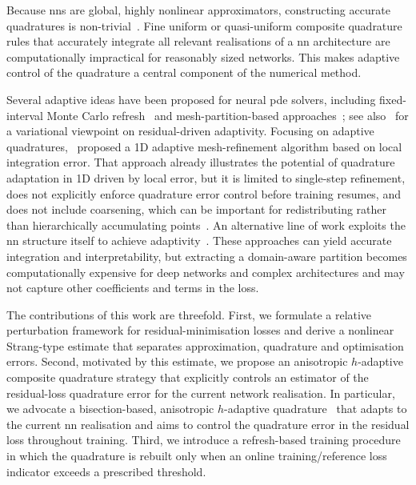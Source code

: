 \documentclass[oneside,reqno,11pt,a4paper]{amsart}
\theoremstyle{definition}
\begin{document}
Because \acp{nn}
are global, highly nonlinear approximators, constructing accurate quadratures
is non-trivial~\cite{Feischl2025nnhard}. Fine uniform or quasi-uniform composite
quadrature rules that accurately integrate all relevant realisations of a
\ac{nn} architecture are computationally impractical for reasonably
sized networks. This makes adaptive control of the quadrature a central component of the numerical method.

Several adaptive ideas have been proposed for neural \ac{pde} solvers,
including fixed-interval Monte Carlo refresh~\cite{Wang2023PINNsGuide} and 
mesh-partition-based approaches~\cite{DLS-Cai-2020, Liu-Cai-Ramani-2023}; see
also~\cite{Toscano2025adaptivity} for a variational viewpoint on
residual-driven adaptivity. Focusing on adaptive quadratures,~\cite{RiveraPINNQuadrature2022} proposed a
1D adaptive mesh-refinement algorithm based on local integration error.
That approach already illustrates the potential of
quadrature adaptation in 1D driven by local error, but it is limited to single-step refinement,
does not explicitly enforce quadrature error control before training resumes,
and does not include coarsening, which can be important for redistributing
rather than hierarchically accumulating points~\cite{AdaptiveFEINNs2024}.
An alternative line of work exploits the \ac{nn} structure itself to
achieve adaptivity~\cite{MagueresseBadiaAdaptive2024, LiuAdaptiveFA2022}. These approaches can yield accurate
integration and interpretability, but extracting a domain-aware partition
becomes computationally expensive for deep networks and complex architectures
\cite{PirateNets2024} and may not capture other coefficients and terms in the
loss.

The contributions of this work are threefold. First, we formulate a relative perturbation framework for residual-minimisation losses and derive a nonlinear Strang-type estimate that separates approximation, quadrature and optimisation errors. Second, motivated by this estimate, we propose an anisotropic $h$-adaptive composite quadrature strategy that explicitly controls an estimator of the residual-loss quadrature error for the current network realisation. In particular, we advocate a bisection-based, anisotropic $h$-adaptive quadrature~\cite{GenzMalik1980} that adapts to the current \ac{nn} realisation and aims to control the quadrature error in the residual loss throughout training. Third, we introduce a refresh-based training procedure in which the quadrature is rebuilt only when an online training/reference loss indicator exceeds a prescribed threshold.
\end{document}
